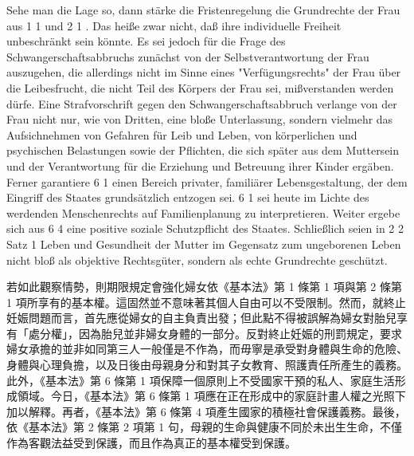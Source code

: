 \documentclass[12pt]{article}
\begin{document}
\syncleft
\begin{sourcepara}
Sehe man die Lage so, dann stärke die Fristenregelung die Grundrechte der Frau aus \abbrArt{} 1 \abbrAbs{} 1 und \abbrArt{} 2 \abbrAbs{} 1 \abbrGG{}. Das heiße zwar nicht, daß ihre individuelle Freiheit unbeschränkt sein könnte. Es sei jedoch für die Frage des Schwangerschaftsabbruchs zunächst von der Selbstverantwortung der Frau auszugehen, die allerdings nicht im Sinne eines "Verfügungsrechts" der Frau über die Leibesfrucht, die nicht Teil des Körpers der Frau sei, mißverstanden werden dürfe. Eine Strafvorschrift gegen den Schwangerschaftsabbruch verlange von der Frau nicht nur, wie von Dritten, eine bloße Unterlassung, sondern vielmehr das Aufsichnehmen von Gefahren für Leib und Leben, von körperlichen und psychischen Belastungen sowie der Pflichten, die sich später aus dem Muttersein und der Verantwortung für die Erziehung und Betreuung ihrer Kinder ergäben. Ferner garantiere \abbrArt{} 6 \abbrAbs{} 1 \abbrGG{} einen Bereich privater, familiärer Lebensgestaltung, der dem Eingriff des Staates grundsätzlich entzogen sei. \abbrArt{} 6 \abbrAbs{} 1 \abbrGG{} sei heute im Lichte des werdenden Menschenrechts auf Familienplanung zu interpretieren. Weiter ergebe sich aus \abbrArt{} 6 \abbrAbs{} 4 \abbrGG{} eine positive soziale Schutzpflicht des Staates. Schließlich seien in \abbrArt{} 2 \abbrAbs{} 2 Satz 1 \abbrGG{}\ggfnArtTwoTwoOneDE{} Leben und Gesundheit der Mutter im Gegensatz zum ungeborenen Leben nicht bloß als objektive Rechtsgüter, sondern als echte Grundrechte geschützt.
\end{sourcepara}
\begin{transpara}
若如此觀察情勢，則期限規定會強化婦女依《基本法》第 1 條第 1 項與第 2 條第 1 項所享有的基本權。這固然並不意味著其個人自由可以不受限制。然而，就終止妊娠問題而言，首先應從婦女的自主負責出發；但此點不得被誤解為婦女對胎兒享有「處分權」，因為胎兒並非婦女身體的一部分。反對終止妊娠的刑罰規定，要求婦女承擔的並非如同第三人一般僅是不作為，而毋寧是承受對身體與生命的危險、身體與心理負擔，以及日後由母親身分和對其子女教育、照護責任所產生的義務。此外，《基本法》第 6 條第 1 項保障一個原則上不受國家干預的私人、家庭生活形成領域。今日，《基本法》第 6 條第 1 項應在正在形成中的家庭計畫人權之光照下加以解釋。再者，《基本法》第 6 條第 4 項產生國家的積極社會保護義務。最後，依《基本法》第 2 條第 2 項第 1 句\ggfnArtTwoTwoOneZH{}，母親的生命與健康不同於未出生生命，不僅作為客觀法益受到保護，而且作為真正的基本權受到保護。
\end{transpara}
\end{document}
